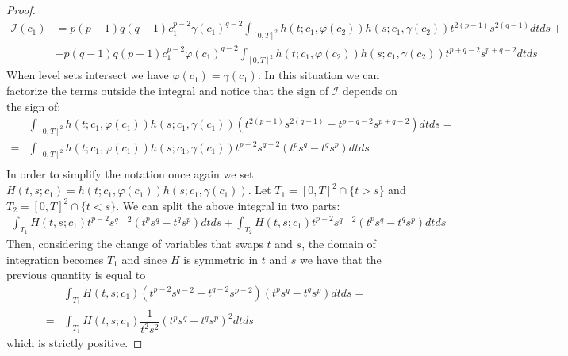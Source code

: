 \documentclass[corpo=11pt, stile=classica, tipotesi=custom,
greek, evenboxes, english]{toptesi}
\numberwithin{equation}{chapter}
\begin{document}
\begin{proof}
\begin{equation*}
	\begin{split}
		\mathcal{I}(c_1) &=p(p-1)q(q-1)c_1^{p-2}\gamma(c_1)^{q-2} \int_{[0,T]^2} h(t;c_1,\varphi(c_2)) h(s;c_1,\gamma(c_2)) t^{2(p-1)} s^{2(q-1)} dtds +\\ &-p(q-1)q(p-1)c_1^{p-2}\varphi(c_1)^{q-2} \int_{[0,T]^2} h(t;c_1,\varphi(c_2)) h(s;c_1,\gamma(c_2)) t^{p+q-2} s^{p+q-2} dtds
	\end{split}
\end{equation*}
When level sets intersect we have $\varphi(c_1)=\gamma(c_1)$. In this situation we can factorize the terms outside the integral and notice that the sign of $\mathcal{I}$ depends on the sign of:
\begin{equation*}
	\begin{split}
		&\int_{[0,T]^2} h(t;c_1,\varphi(c_1)) h(s;c_1,\gamma(c_1))\left( t^{2(p-1)} s^{2(q-1)} - t^{p+q-2} s^{p+q-2} \right)dtds=\\
		=&\int_{[0,T]^2} h(t;c_1,\varphi(c_1)) h(s;c_1,\gamma(c_1)) t^{p-2}s^{q-2}\left( t^p s^q - t^q s^p \right)dtds\\
	\end{split}
\end{equation*}
In order to simplify the notation once again we set $H(t,s;c_1) = h(t;c_1,\varphi(c_1)) h(s;c_1,\gamma(c_1))$. Let $T_1 = [0,T]^2 \cap \{t>s\}$ and $T_2 = [0,T]^2 \cap \{t<s\}$. We can split the above integral in two parts:
\begin{equation*}
	\begin{split}
		\int_{T_1} H(t,s;c_1)t^{p-2}s^{q-2}\left( t^p s^q - t^q s^p \right)dtds + \int_{T_2} H(t,s;c_1)t^{p-2}s^{q-2}\left( t^p s^q - t^q s^p \right)dtds
	\end{split}
\end{equation*}
Then, considering the change of variables that swaps $t$ and $s$, the domain of integration becomes $T_1$ and since $H$ is symmetric in $t$ and $s$ we have that the previous quantity is equal to
\begin{equation*}
	\begin{split}
		&\int_{T_1} H(t,s;c_1)\left( t^{p-2} s^{q-2} - t^{q-2} s^{p-2} \right) \left( t^p s^q - t^q s^p \right)dtds =\\
		=& \int_{T_1} H(t,s;c_1)\dfrac{1}{t^2 s^2}\left( t^p s^q - t^q s^p \right)^2 dtds
	\end{split}
\end{equation*}
which is strictly positive.


\end{proof}
\end{document}
